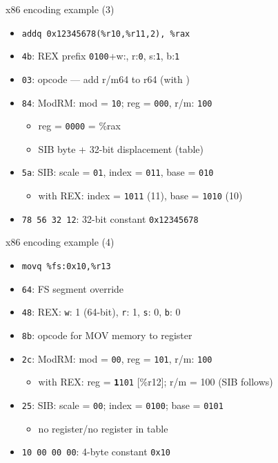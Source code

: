 \begin{frame}[fragile,label=x86ex3]{x86 encoding example (3)}
    \begin{itemize}
    \item \lstinline|addq 0x12345678(%r10,%r11,2), %rax|
    \item {\tt 4b}: REX prefix {\tt 0100}+w:{\tt {}}, r:{\tt \textcolor{orange!80!black}{0}}, s:{\tt \textcolor{blue!80!black}{1}}, b:{\tt \textcolor{green!80!black}{1}}
    \item {\tt 03}: opcode --- add r/m64 to r64 (with )
    \item {\tt 84}: ModRM: mod = {\tt 10}; reg = {\tt 000}, r/m: {\tt 100}
        \begin{itemize}
        \item reg = {\tt \textcolor{orange!80!black}{0}000} = \%rax
        \item SIB byte + 32-bit displacement (table)
        \end{itemize}
    \item {\tt 5a}: SIB: scale = {\tt 01}, index = {\tt 011}, base = {\tt 010}
        \begin{itemize}
        \item with REX: index = {\tt \textcolor{blue!80!black}{1}011} (11), base = {\tt \textcolor{green!80!black}{1}010} (10)
        \end{itemize}
    \item {\tt 78 56 32 12}: 32-bit constant {\tt 0x12345678}
    \end{itemize}
\end{frame}

\begin{frame}[fragile,label=x86ex4]{x86 encoding example (4)}
    \begin{itemize}
    \item \lstinline|movq %fs:0x10,%r13|
    \item {\tt 64}: FS segment override
    \item {\tt 48}: REX: {\tt w}: 1 (64-bit), {\tt r}: \textcolor{orange!80!black}{1}, {\tt s}: \textcolor{blue!80!black}{0}, {\tt b}: \textcolor{green!80!black}{0}
    \item {\tt 8b}: opcode for MOV memory to register
    \item {\tt 2c}: ModRM: mod = {\tt 00}, reg = {\tt 101}, r/m: {\tt 100}
        \begin{itemize}
        \item with REX: reg = {\tt \textbf{\textcolor{orange!80!black}{1}}101} [\%r12]; r/m = {100} (SIB follows)
        \end{itemize}
    \item {\tt 25}: SIB: scale = {\tt 00}; index = {\tt \textcolor{blue!80!black}{0}100}; base = {\tt \textcolor{green!80!black}{0}101}
        \begin{itemize}
        \item no register/no register in table
        \end{itemize}
    \item {\tt 10 00 00 00}: 4-byte constant {\tt 0x10}
    \end{itemize}
\end{frame}



